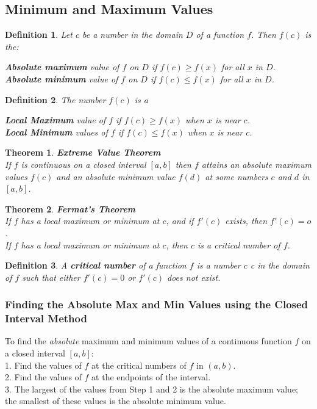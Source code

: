\documentclass[10pt,a4paper]{article}
\newtheorem{theorem}{Theorem}
\newtheorem{definition}{Definition}
\begin{document}
\subsection{Minimum and Maximum Values}
\begin{definition}
	Let $c$ be a number in the domain $D$ of a function $f$. Then $f(c)$ is the:
	\begin{center}
		\textbf{Absolute maximum} value of $f$ on $D$ if $f(c) \geq f(x) $ for all $x$ in $D$.
\\		\textbf{Absolute minimum} value of $f$ on $D$ if $f(c) \leq f(x) $ for all $x$ in $D$.
	\end{center}
\end{definition}
\begin{definition}
	The number $f(c)$ is a
	\begin{center}
		\textbf{Local Maximum} value of $f$ if $f(c) \geq f(x)$ when $x$ is near $c$.
\\		\textbf{Local Minimum} values of $f$ if $f(c) \leq f(x)$ when $x$ is near $c$.
	\end{center}
\end{definition}
\begin{theorem}
	\textbf{Extreme Value Theorem}
\\	If $f$ is continuous on a closed interval $[a,b]$ then $f$ attains an absolute maximum values $f(c)$ and an absolute minimum value $f(d)$ at some numbers $c$ and $d$ in $[a,b]$.
\end{theorem}
\begin{theorem}
	\textbf{Fermat's Theorem}
\\	If $f$ has a local maximum or minimum at $c$, and if $f'(c)$ exists, then $f'(c)=o$.
\\If $f$ has a local maximum or minimum at $c$, then $c$ is a critical number of $f$.
\end{theorem}
\begin{definition}
	A \textbf{critical number} of a function $f$ is a number $c$ c in the domain of $f$ such that either $f'(c)=0$ or $f'(c)$ does not exist.
\end{definition}
\subsubsection{Finding the Absolute Max and Min Values using the Closed Interval Method}
To find the \textit{absolute} maximum and minimum values of a continuous function $f$ on a closed interval $[a,b]$:
\\1. Find the values of $f$ at the critical numbers of $f$ in $(a,b)$.
\\2. Find the values of $f$ at the endpoints of the interval.
\\3. The largest of the values from Step 1 and 2 is the absolute maximum value; the smallest of these values is the absolute minimum value.
\end{document}

